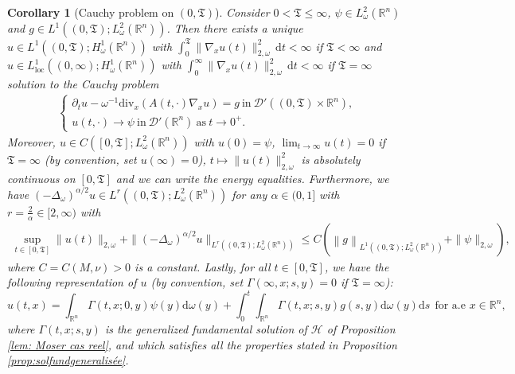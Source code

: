 \documentclass[12pt, letterpaper]{amsart}
\newtheorem{cor}[thm]{Corollary}
\theoremstyle{definition}
\theoremstyle{remark}
\numberwithin{equation}{section}
\begin{document}
\begin{cor}[Cauchy problem on $(0,\mathfrak{T})$]
Consider $0<\mathfrak{T}\le \infty$, $\psi \in L^2_\omega(\mathbb{R}^n)$ and $g \in L^1((0,\mathfrak{T});L^2_\omega(\mathbb{R}^n))$. Then there exists a unique $u \in L^1((0,\mathfrak{T});H^1_\omega(\mathbb{R}^n))$ with $\int_0^\mathfrak{T}\|\nabla_x u(t)\|^2_{2,\omega}\, \mathrm{d}t<\infty$ if $\mathfrak{T}<\infty$ and $u \in L^1_{\mathrm{loc}}((0,\infty);H^1_\omega(\mathbb{R}^n))$ with $\int_0^\infty\|\nabla_x u(t)\|^2_{2,\omega}\, \mathrm{d}t<\infty$ if $\mathfrak{T}=\infty$ solution to the Cauchy problem 
\begin{align*}
\left\{
    \begin{array}{ll}
        \partial_t u -\omega^{-1} \mathrm{div}_x(A(t,\cdot)\nabla_x u)= g \ \mathrm{in} \  \mathcal{D}'((0,\mathfrak{T})\times \mathbb{R}^n), \\
        u(t,\cdot) \to \psi \ \mathrm{in} \ \mathcal{D}'(\mathbb{R}^n) \ \mathrm{as} \ t \to 0^+.
    \end{array}
\right.
\end{align*} 
Moreover, $u \in C([0,\mathfrak{T}];L^2_\omega(\mathbb{R}^n))$ with $u(0)=\psi$, $\lim_{t \to \infty} u(t)=0$ if $\mathfrak{T}=\infty$ (by convention, set $u(\infty)=0$), $t \mapsto \| u(t)  \|^2_{2,\omega}$ is absolutely continuous on $[0,\mathfrak{T}]$ and we can write the energy equalities. Furthermore, we have $(-\Delta_\omega)^{\alpha/2} u \in  L^r((0,\mathfrak{T});L^2_\omega(\mathbb{R}^n))$ for any $\alpha \in (0,1]$ with $r=\frac{2}{\alpha} \in [2,\infty)$ with
\begin{align*}
            \sup_{t\in [0,\mathfrak{T}]} \| u(t) \|_{2,\omega}+ \| (-\Delta_\omega)^{\alpha /2} u\|_{L^r((0,\mathfrak{T});L^2_\omega(\mathbb{R}^n))} 
            \leq C  (  \left \| g \right \|_{L^{1}((0,\mathfrak{T});L^2_\omega(\mathbb{R}^n))}+  \| \psi  \|_{2,\omega}  ),
\end{align*} 
where $C=C(M,\nu)>0$ is a constant. Lastly,  for all $t \in [0,\mathfrak{T}]$, we have the following representation of $u$ (by convention, set $\Gamma(\infty,x;s,y)=0$ if $\mathfrak{T}=\infty$): 
\begin{equation*}
    u(t,x)= \int_{\mathbb{R}^n} \Gamma(t,x;0,y)\psi(y) \mathrm d \omega(y)+\int_0^t \int_{\mathbb{R}^n} \Gamma(t,x;s,y) g(s,y) \mathrm d \omega(y) \mathrm d s \ \ \text{for a.e } x \in \mathbb{R}^n,
\end{equation*}
where $\Gamma(t,x;s,y)$ is the generalized fundamental solution of $\mathcal{H}$ of Proposition \ref{lem: Moser cas reel}, and which satisfies all the properties stated in Proposition \ref{prop:solfundgeneralisée}.
\end{cor}
\end{document}
